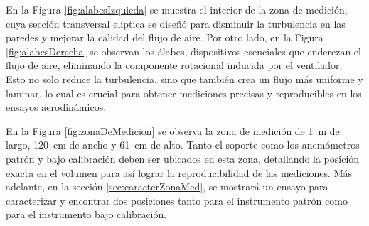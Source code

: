 En la Figura \ref{fig:alabesIzquieda} se muestra el interior de la zona de medición, cuya sección transversal elíptica se diseñó para disminuir la turbulencia en las paredes y mejorar la calidad del flujo de aire. Por otro lado, en la Figura \ref{fig:alabesDerecha} se observan los álabes, dispositivos esenciales que enderezan el flujo de aire, eliminando la componente rotacional inducida por el ventilador. Esto no solo reduce la turbulencia, sino que también crea un flujo más uniforme y laminar, lo cual es crucial para obtener mediciones precisas y reproducibles en los ensayos aerodinámicos. 

En la Figura \ref{fig:zonaDeMedicion} se observa la zona de medición de \SI{1}{\meter} de largo, \SI{120}{\centi\meter} de ancho y \SI{61}{\centi\meter} de alto. Tanto el soporte como los anemómetros patrón y bajo calibración deben ser ubicados en esta zona, detallando la posición exacta en el volumen para así lograr la reproducibilidad de las mediciones. Más adelante, en la sección \ref{sec:caracterZonaMed}, se mostrará un ensayo para caracterizar y encontrar dos posiciones tanto para el instrumento patrón como para el instrumento bajo calibración.

